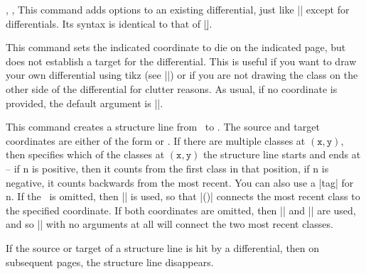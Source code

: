 \begin{sseqdata}[name = basic, cohomological Serre grading]
\begin{commandlist}{
    {\doptions\moptions{}},
    {\doptions\moptions{}\pars{\sourcename\opt{,\targetn}}},
    {\doptions\moptions{}\pars{\sourcecoord}\pars{\targetcoord}}%
}
This command adds options to an existing differential, just like |\classoptions| except for differentials. Its syntax is identical to that of |\d|.
\end{commandlist}

\begin{command}{\kill{}}
This command sets the indicated coordinate to die on the indicated page, but does not establish a target for the differential. This is useful if you want to draw your own differential using tikz (see |\getdtarget|) or if you are not drawing the class on the other side of the differential for clutter reasons. As usual, if no coordinate is provided, the default argument is |\lastclass|.
\end{command}

\begin{command}{\structline\ooptions\opt{\pars{\sourcecoord}\pars{\targetcoord}}}
This command creates a structure line from \sourcecoord\  to \targetcoord. The source and target coordinates are either of the form  or . If there are multiple classes at $\mathtt{(x,y)}$, then  specifies which of the classes at $\mathtt{(x,y)}$ the structure line starts and ends at -- if n is positive, then it counts from the first class in that position, if n is negative, it counts backwards from the most recent. You can also use a |tag| for n. If the \targetcoord\ is omitted, then |\lastclass| is used, so that |\structline(\sourcecoord)| connects the most recent class to the specified coordinate. If both coordinates are omitted, then |\lastclass| and || are used, and so |\structline| with no arguments at all will connect the two most recent classes.

If the source or target of a structure line is hit by a differential, then on subsequent pages, the structure line disappears.


\end{command}
\end{sseqdata}
